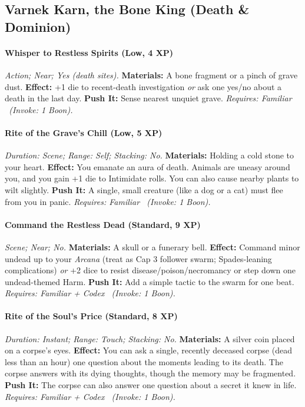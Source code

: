\documentclass[12pt,twoside]{book}
\begin{document}
\subsection{Varnek Karn, the Bone King (Death \& Dominion)}
\paragraph{Whisper to Restless Spirits (Low, 4 XP)} \emph{Action; Near; Yes (death sites).}
\textbf{Materials:} A bone fragment or a pinch of grave dust.
\textbf{Effect:} +1 die to recent-death investigation \emph{or} ask one yes/no about a death in the last day.
\textbf{Push It:} Sense nearest unquiet grave.
\emph{Requires: Familiar \ (\textit{Invoke:} 1 Boon).}
\paragraph{Rite of the Grave's Chill (Low, 5 XP)} \emph{Duration: Scene; Range: Self; Stacking: No.}
\textbf{Materials:} Holding a cold stone to your heart.
\textbf{Effect:} You emanate an aura of death. Animals are uneasy around you, and you gain +1 die to Intimidate rolls. You can also cause nearby plants to wilt slightly.
\textbf{Push It:} A single, small creature (like a dog or a cat) must flee from you in panic.
\emph{Requires: Familiar \ (\textit{Invoke:} 1 Boon).}
\paragraph{Command the Restless Dead (Standard, 9 XP)} \emph{Scene; Near; No.}
\textbf{Materials:} A skull or a funerary bell.
\textbf{Effect:} Command minor undead up to your \emph{Arcana} (treat as Cap 3 follower swarm; Spades-leaning complications) \emph{or} +2 dice to resist disease/poison/necromancy or step down one undead-themed Harm.
\textbf{Push It:} Add a simple tactic to the swarm for one beat.
\emph{Requires: Familiar + Codex \ (\textit{Invoke:} 1 Boon).}
\paragraph{Rite of the Soul's Price (Standard, 8 XP)} \emph{Duration: Instant; Range: Touch; Stacking: No.}
\textbf{Materials:} A silver coin placed on a corpse's eyes.
\textbf{Effect:} You can ask a single, recently deceased corpse (dead less than an hour) one question about the moments leading to its death. The corpse answers with its dying thoughts, though the memory may be fragmented.
\textbf{Push It:} The corpse can also answer one question about a secret it knew in life.
\emph{Requires: Familiar + Codex \ (\textit{Invoke:} 1 Boon).}
\end{document}
